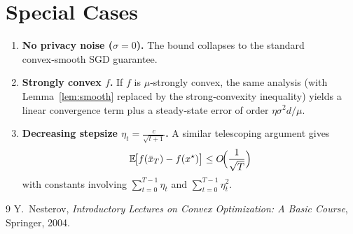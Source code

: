 \documentclass{article}
\newcommand{\EE}{\mathbb{E}}
\begin{document}
\section*{Special Cases}
\begin{enumerate}[label=\alph*.]
\item \textbf{No privacy noise ($\sigma=0$).} The bound collapses to the standard convex‑smooth SGD guarantee.
\item \textbf{Strongly convex $f$.} If $f$ is $\mu$‑strongly convex, the same analysis (with Lemma~\ref{lem:smooth} replaced by the strong‑convexity inequality) yields a linear convergence term plus a steady‑state error of order $\eta\sigma^2 d/\mu$.
\item \textbf{Decreasing stepsize $\eta_t=\frac{c}{\sqrt{t+1}}$.} A similar telescoping argument gives
\[
\EE\!\bigl[f(\bar x_T)-f(x^\star)\bigr]\le
O\!\Bigl(\frac{1}{\sqrt{T}}\Bigr)
\]
with constants involving $\sum_{t=0}^{T-1}\eta_t$ and $\sum_{t=0}^{T-1}\eta_t^2$.
\end{enumerate}

\begin{thebibliography}{9}
Y.~Nesterov,
\textit{Introductory Lectures on Convex Optimization: A Basic Course},
Springer, 2004.
\end{thebibliography}
\end{document}
